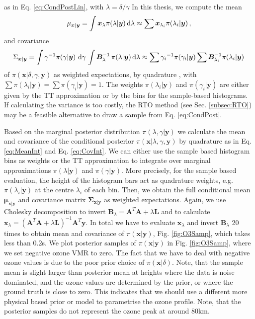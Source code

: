 as in Eq. \ref{eq:CondPostLin}, with $\lambda = \delta / \gamma $
In this thesis, we compute the mean
\begin{align}
	\mu_{\bm{x}|\bm{y}} = \int \bm{x}_{\lambda} \pi(\lambda| \bm{y}) \mathop{}\!\mathrm{d}\lambda \approx \sum \bm{x}_{\lambda_i} \pi(\lambda_i| \bm{y}) \, , \label{eq:MeanInt}
\end{align} and covariance
\begin{align}
	\Sigma_{\bm{x}|\bm{y}} = \int \gamma^{-1}  \pi(\gamma | \bm{y} ) \, \mathop{}\!\mathrm{d} \gamma \, \int  \bm{B}_{\lambda}^{-1} \, \pi(\lambda | \bm{y} )  \, \text{d} \lambda  \approx \sum {\gamma_i}^{-1}\pi(\gamma_i| \bm{y}) \sum \bm{B}_{\lambda_i}^{-1}\pi(\lambda_i| \bm{y})\, \label{eq:CovInt}
\end{align}
of $\pi(\bm{x}| \delta, \gamma, \bm{y})$ as weighted expectations, by quadrature \cite[Sec. 2.1]{Dick_Kuo_Sloan_2013}, with $\sum \pi(\lambda_i| \bm{y}) = \sum \pi(\gamma_i| \bm{y}) = 1$.
The weights $\pi(\lambda_i| \bm{y})$ and $\pi(\gamma_i| \bm{y})$ are either given by the TT approximation or by the bins for the sample-based histograms.
If calculating the variance is too costly, the RTO method (see Sec. \ref{subsec:RTO}) may be a feasible alternative to draw a sample from Eq. \ref{eq:CondPost}.

Based on the marginal posterior distribution $\pi(\lambda, \gamma| \bm{y})$ we calculate the mean and covariance of the conditional posterior $\pi(\bm{x} |\lambda, \gamma, \bm{y})$ by quadrature as in Eq. \ref{eq:MeanInt} and Eq. \ref{eq:CovInt}.
We can either use the sample based histogram bins as weights or the TT approximation to integrate over marginal approximations $\pi(\lambda| \bm{y})$ and $\pi( \gamma | \bm{y})$.
More precisely, for the sample based evaluation, the height of the histogram bars act as quadrature weights, e.g. $\pi(\lambda_i| \bm{y})$ at the centre $\lambda_i$ of each bin.
Then, we obtain the full conditional mean $\bm{\mu}_{\bm{x}|\bm{y}}$ and covariance matrix $\bm{\Sigma}_{\bm{x}|\bm{y}}$ as weighted expectations.
Again, we use Cholesky decomposition to invert $\bm{B}_{\lambda} = \bm{A}^T \bm{A} + \lambda \bm{L}$ and to calculate $\bm{x}_{\lambda} = (\bm{A}^T \bm{A} + \lambda \bm{L} )^{-1} \bm{A}^T \bm{y}$.
In total we have to evaluate $\bm{x}_{\lambda}$ and invert $\bm{B}_{\lambda}$ 20 times to obtain mean and covariance of $\pi(\bm{x}|\bm{y})$, Fig. \ref{fig:O3Samp}, which takes less than $0.2$s.
We plot posterior samples of $\pi(\bm{x}|\bm{y})$ in Fig. \ref{fig:O3Samp}, where we set negative ozone VMR to zero.
The fact that we have to deal with negative ozone values is due to the poor prior choice of $\pi(\bm{x}|\delta)$.
Note, that the sample mean is slight larger than posterior mean at heights where the data is noise dominated, and the ozone values are determined by the prior, or where the ground truth is close to zero.
This indicates that we should use a different more physical based prior or model to parametrise the ozone profile.
Note, that the posterior samples do not represent the ozone peak at around $80$km.


